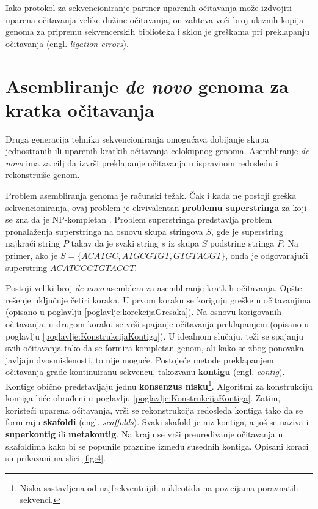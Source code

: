 \documentclass[12pt,oneside]{memoir}
\begin{document}
Iako protokol za sekvencioniranje partner-uparenih očitavanja može izdvojiti uparena očitavanja velike dužine očitavanja, on zahteva veći broj ulaznih kopija genoma za pripremu sekvencerskih biblioteka i sklon je greškama pri preklapanju očitavanja (engl. \textit{ligation errors}).
\begin{comment}
(ligation errors - greškama prilikom preklapanja očitavanja)
\end{comment}


\section{Asembliranje \textit{de novo} genoma za kratka očitavanja}

Druga generacija tehnika sekvencioniranja omogućava dobijanje skupa jednostranih ili uparenih kratkih očitavanja celokupnog genoma. Asembliranje \textit{de novo} ima za cilj da izvrši preklapanje očitavanja u ispravnom redosledu i rekonstruiše genom.

Problem asembliranja genoma je računski težak. Čak i kada ne postoji greška sekvencioniranja, ovaj problem je ekvivalentan \textbf{problemu superstringa} za koji se zna da je NP-kompletan \cite{NPcomplexity}. Problem superstringa predstavlja problem pronalaženja superstringa na osnovu skupa stringova $S$, gde je superstring najkraći string $P$ takav da je svaki string $s$ iz skupa $S$ podstring stringa $P$. Na primer, ako je $S = \{ACATGC, ATGCGTGT, GTGTACGT\}$, onda je odgovarajući superstring $ACATGCGTGTACGT$.

Postoji veliki broj \textit{de novo} asemblera za asembliranje kratkih očitavanja. Opšte rešenje uključuje četiri koraka. U prvom koraku se koriguju greške u očitavanjima (opisano u poglavlju \ref{poglavlje:korekcijaGresaka}). Na osnovu korigovanih očitavanja, u drugom koraku se vrši spajanje očitavanja preklapanjem (opisano u poglavlju \ref{poglavlje:KonstrukcijaKontiga}). U idealnom slučaju, teži se spajanju svih očitavanja tako da se formira kompletan genom, ali kako se zbog ponovaka javljaju dvosmislenosti, to nije moguće. Postojeće metode preklapanjem očitavanja grade kontinuiranu sekvencu, takozvanu \textbf{kontigu} (engl. \textit{contig}). Kontige obično predstavljaju jednu \textbf{konsenzus nisku}\footnote{Niska sastavljena od najfrekventnijih nukleotida na pozicijama poravnatih sekvenci.}. Algoritmi za konstrukciju kontiga biće obrađeni u poglavlju \ref{poglavlje:KonstrukcijaKontiga}. Zatim, koristeći uparena očitavanja, vrši se rekonstrukcija redosleda kontiga tako da se formiraju \textbf{skafoldi} (engl. \textit{scaffolds}). Svaki skafold je niz kontiga, a još se naziva i \textbf{superkontig} ili \textbf{metakontig}. Na kraju se vrši preuređivanje očitavanja u skafoldima kako bi se popunile praznine između susednih kontiga. Opisani koraci su prikazani na slici \ref{fig:4}.
\end{document}
